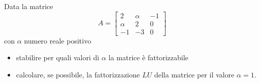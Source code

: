 Data la matrice
\[
A=\left[
\begin{array}{ccc}
2 & \alpha & -1 \\
\alpha & 2 & 0\\
-1 & -3 & 0
\end{array}\right]
\]
con $\alpha$ numero reale positivo
\begin {itemize}
\item stabilire per quali valori di $\alpha$ la matrice \`{e}
 fattorizzabile
\item calcolare, se possibile, la fattorizzazione $LU$ della matrice
  per il valore $\alpha=1$.
\end{itemize}
